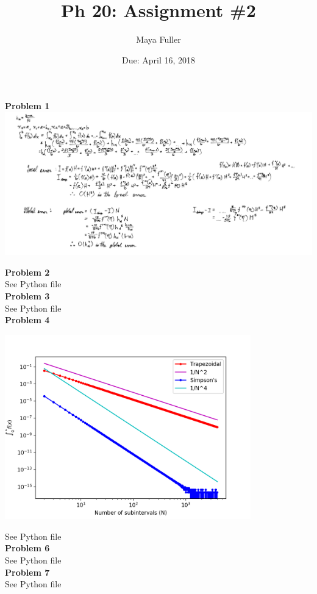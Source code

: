 \documentclass[12pt]{article}
\title{Ph 20: Assignment \#2}
\author{Maya Fuller}
\date{Due: April 16, 2018} %
\begin{document}
	
	
	\maketitle

	\noindent\textbf{\large Problem 1}\\[5mm]
		\includegraphics[width=\textwidth]{derivation.png}
	
	\noindent\textbf{\large Problem 2}\\
		See Python file\\[5mm]
	\noindent\textbf{\large Problem 3}\\
		See Python file \\[5mm]
	\noindent\textbf{\large Problem 4}
		\begin{center}
				\includegraphics[width=0.8\textwidth]{prob4.png}
		\end{center}		
		See Python file\\[5mm]
	\noindent\textbf{\large Problem 6}\\
		See Python file\\[5mm]
	\noindent\textbf{\large Problem 7}\\
		See Python file
			
		
\end{document}
